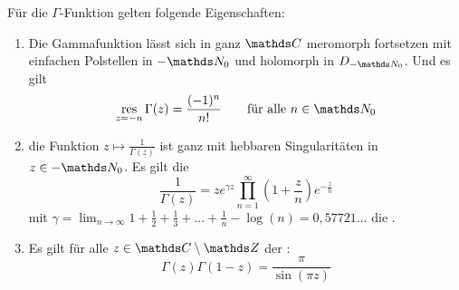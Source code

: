 \begin{satz-noind}\label{satz:gamma-eigenschaften}
Für die $\Gamma$-Funktion gelten folgende Eigenschaften:
\begin{enumerate}
\item Die Gammafunktion lässt sich in ganz $\CC$ meromorph fortsetzen mit einfachen Polstellen in $-\NN_0$ und holomorph in $D_{-\NN_0}$. Und es gilt
\[
	\res_{z=-n} \Gamma(z)
	= \frac{(-1)^n}{n!}
	\qquad \text{für alle } n\in\NN_0
\]

\item die Funktion $z\mapsto \frac{1}{\Gamma(z)}$ ist ganz mit hebbaren Singularitäten in $z\in-\NN_0$. Es gilt die 
\[
	\frac{1}{\Gamma(z)} = ze^{\gamma z} \prod_{n=1}^\infty \left(1+\frac{z}{n}\right)e^{-\frac{z}{n}}
\]
mit $\gamma = \lim_{n\to\infty} 1 + \frac{1}{2} + \frac{1}{3} + \ldots + \frac{1}{n} - \log(n) = 0,57721\dots$ die .

\item Es gilt für alle $z\in\CC\setminus\ZZ$ der :
\[
	\Gamma(z)\Gamma(1-z)
	= \frac{\pi}{\sin(\pi z)}
\]
\end{enumerate}
\end{satz-noind}

